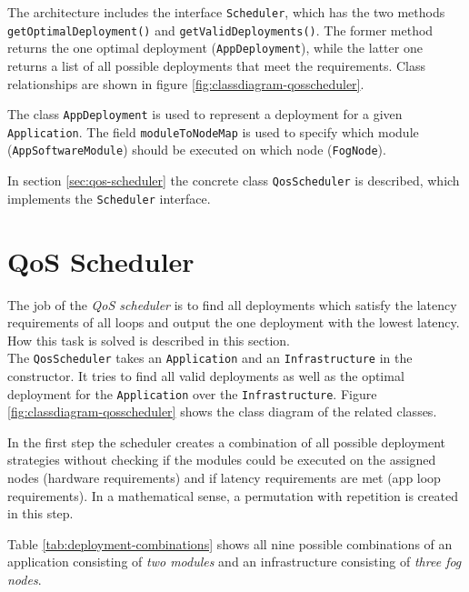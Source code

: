 The architecture includes the interface \texttt{Scheduler}, which has the two methods \texttt{getOptimalDeployment()} and \texttt{getValidDeployments()}. The former method returns the one optimal deployment (\texttt{AppDeployment}), while the latter one returns a list of all possible deployments that meet the requirements. Class relationships are shown in figure \ref{fig:classdiagram-qosscheduler}.

The class \texttt{AppDeployment} is used to represent a deployment for a given \texttt{Application}. The field \texttt{moduleToNodeMap} is used to specify which module (\texttt{AppSoftwareModule}) should be executed on which node (\texttt{FogNode}).

In section \ref{sec:qos-scheduler} the concrete class \texttt{QosScheduler} is described, which implements the \texttt{Scheduler} interface.



\section{QoS Scheduler\label{sec:qos-scheduler}}
The job of the \textit{QoS scheduler} is to find all deployments which satisfy the latency requirements of all loops and output the one deployment with the lowest latency. How this task is solved is described in this section.\\

The \texttt{QosScheduler} takes an \texttt{Application} and an \texttt{Infrastructure} in the constructor. It tries to find all valid deployments as well as the optimal deployment for the \texttt{Application} over the \texttt{Infrastructure}. Figure \ref{fig:classdiagram-qosscheduler} shows the class diagram of the related classes.

In the first step the scheduler creates a combination of all possible deployment strategies without checking if the modules could be executed on the assigned nodes (hardware requirements) and if latency requirements are met (app loop requirements).
In a mathematical sense, a permutation with repetition is created in this step.

Table \ref{tab:deployment-combinations} shows all nine possible combinations of an application consisting of \textit{two modules} and an infrastructure consisting of \textit{three fog nodes}.


